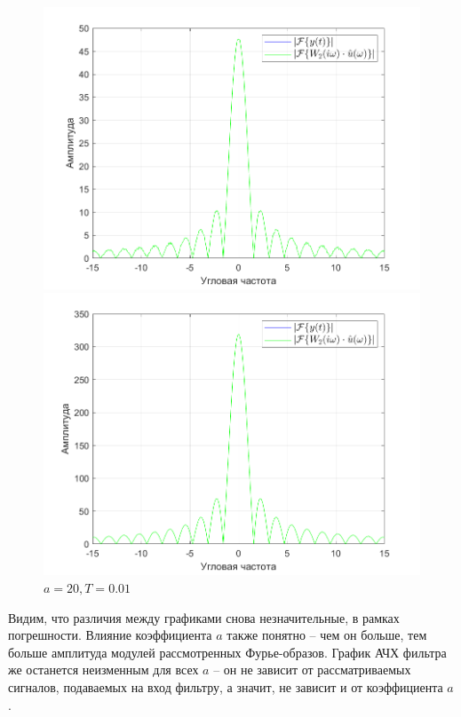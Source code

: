 \documentclass[a4paper]{article}
\begin{document}
\begin{figure}[H]
    \begin{minipage}{0.5\textwidth}
        \centering
        \includegraphics[width=\linewidth]{ex1_1/a=3_T=0.01/h4.png}
        \caption{$a = 3, T = 0.01$}
    \end{minipage}
    \begin{minipage}{0.5\textwidth}
        \centering
        \includegraphics[width=\linewidth]{ex1_1/a=20_T=0.01/h4.png}
        \caption{$a = 20, T = 0.01$}
    \end{minipage}
\end{figure}

Видим, что различия между графиками снова незначительные, в рамках погрешности. Влияние коэффициента $a$ также понятно -- чем он больше, тем больше амплитуда модулей рассмотренных Фурье-образов. График АЧХ фильтра же останется неизменным для всех $a$ -- он не зависит от рассматриваемых сигналов, подаваемых на вход фильтру, а значит, не зависит и от коэффициента $a$.
\end{document}
